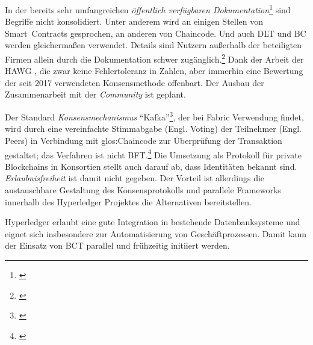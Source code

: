 In der bereits sehr umfangreichen \emph{öffentlich verfügbaren Dokumentation}\footnote{\cite{w:hyperledger:doc}} sind Begriffe nicht konsolidiert.
Unter anderem wird an einigen Stellen von Smart~Contracts gesprochen, an anderen von Chaincode.
Und auch \gls{DLT} und \gls{BC} werden gleichermaßen verwendet.
Details sind Nutzern außerhalb der beteiligten Firmen allein durch die Dokumentation schwer zugänglich.\footnote{\cite{p:hyperledger:arch}}
Dank der Arbeit der \gls{HAWG} \cite{p:hyperledger:consensus}, die zwar keine Fehlertoleranz in Zahlen, aber immerhin eine Bewertung der seit 2017 verwendeten Konsensmethode offenbart.
Der Ausbau der Zusammenarbeit mit der \emph{Community} ist geplant.

Der Standard \emph{Konsensmechanismus} \enquote{Kafka}\footnote{\cite{w:kafka}}, der bei  Fabric Verwendung findet, wird durch eine vereinfachte Stimmabgabe (Engl. Voting) der Teilnehmer (Engl. Peers) in Verbindung mit \gls{glos:Chaincode} zur Überprüfung der Transaktion gestaltet; das Verfahren ist nicht \gls{BFT}.\footnote{\cite{w:hyperledger:txworkflow}}
Die Umsetzung als Protokoll für private Blockchains in Konsortien stellt auch darauf ab, dass Identitäten bekannt sind.
\emph{Erlaubnisfreiheit} ist damit nicht gegeben.
Der Vorteil ist allerdings die austauschbare Gestaltung des Konsensprotokolls und parallele Frameworks innerhalb des Hyperledger Projektes die Alternativen bereitstellen.

Hyperledger erlaubt eine gute Integration in bestehende Datenbanksysteme und eignet sich insbesondere zur Automatisierung von Geschäftprozessen.
Damit kann der Einsatz von \gls{BCT} parallel und frühzeitig initiiert werden.

